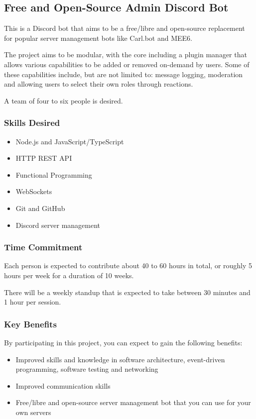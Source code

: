 \documentclass[../proposal-for-projects-2025.tex]{subfiles}
\begin{document}
\subsection{Free and Open-Source Admin Discord Bot}

This is a Discord bot that aims to be a free/libre and open-source replacement for popular server management bots like Carl.bot and MEE6.  

The project aims to be modular, with the core including a plugin manager that allows various capabilities to be added or removed on-demand by users. Some of these capabilities include, but are not limited to: message logging, moderation and allowing users to select their own roles through reactions.

A team of four to six people is desired.

\subsubsection*{Skills Desired}

\begin{multicols}{2}
\begin{itemize}
    \item Node.js and JavaScript/TypeScript
    \item HTTP REST API
    \item Functional Programming
    \item WebSockets
    \item Git and GitHub
    \item Discord server management
\end{itemize}
\end{multicols}

\subsubsection*{Time Commitment}

Each person is expected to contribute about 40 to 60 hours in total, or roughly 5 hours per week for a duration of 10 weeks.

There will be a weekly standup that is expected to take between 30 minutes and 1 hour per session.

\subsubsection*{Key Benefits}

By participating in this project, you can expect to gain the following benefits:

\begin{itemize}
    \item Improved skills and knowledge in software architecture, event-driven programming, software testing and networking
    \item Improved communication skills
    \item Free/libre and open-source server management bot that you can use for your own servers
\end{itemize}
\end{document}
